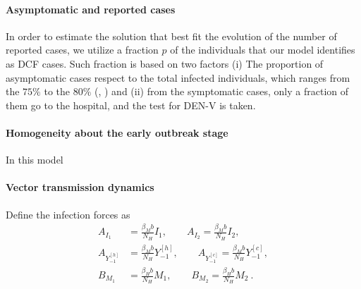     \paragraph{Asymptomatic and reported cases} In order to estimate the solution that best fit the 
    evolution of the number of reported cases, we utilize a fraction $p$ of the individuals that our model identifies as DCF cases. Such fraction is based on two factors (i) The proportion of asymptomatic cases respect to the total infected individuals, which ranges from the $75\%$ to the $80\%$ (\cite{Bosch2018}, \cite{Reiter2010}) and (ii) from the symptomatic cases, only a fraction of them
     go to the hospital, and the test for DEN-V is taken. 
    
%    


    
    \paragraph{Homogeneity about the early outbreak stage}
In this model    
    

    \paragraph{Vector transmission dynamics}
        Define the infection forces as
    \begin{equation}
        \begin{aligned}
            A_{I_1} &=
                \frac{\beta_Mb}{N_H} I_1, \qquad
            A_{I_2}=
                \frac{\beta_Mb}{N_H} I_2,
        \\
            A_{Y_{-1}^{[h]}}&=
            \frac{\beta_Mb}{N_H} Y_{-1} ^{[h]}, \qquad
            A_{Y_{-1}^{[c]}}=
                \frac{\beta_Mb}{N_H} Y_{-1}^{[c]},
        \\
            B_{M_1} &= 
                \frac{\beta_Hb}{N_H}M_1, \qquad
            B_{M_2}=
                \frac{\beta_Hb}{N_H}M_2 ~.
        \end{aligned}
    \end{equation}

